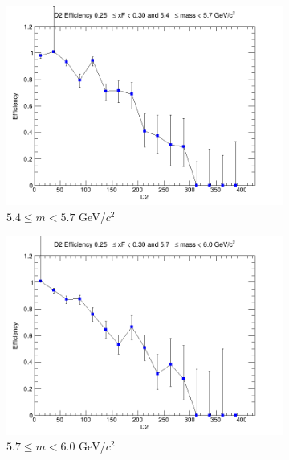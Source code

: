 \begin{figure}[p]
\begin{subfigure}[b]{0.32\textwidth}
        \includegraphics[width=\textwidth]{./kTrackerEfficiencyPlots/D2_Efficiency_xF5_mass4.png}
        \caption{$5.4 \leq m < 5.7$ GeV/$c^2$}
        \label{fig:xF5_mass4}
    \end{subfigure}
    \hfill
    \begin{subfigure}[b]{0.32\textwidth}
        \centering
        \includegraphics[width=\textwidth]{./kTrackerEfficiencyPlots/D2_Efficiency_xF5_mass5.png}
        \caption{$5.7 \leq m < 6.0$ GeV/$c^2$}
        \label{fig:xF5_mass5}
    \end{subfigure}
    \vspace{0.5cm}
    \begin{subfigure}[b]{0.32\textwidth}
        \centering

\end{subfigure}
\end{figure}

